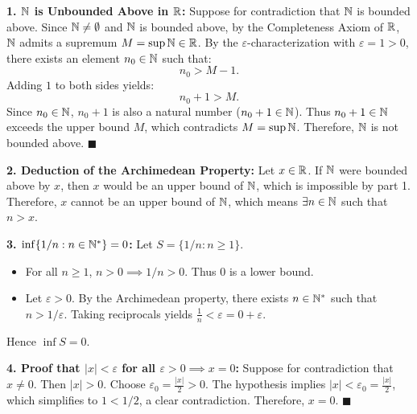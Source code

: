 \begin{tabletworkspace}[5.0cm]
\end{tabletworkspace}

\begin{solution}
\textbf{1. $\mathbb{N}$ is Unbounded Above in $\mathbb{R}$:}
Suppose for contradiction that $\mathbb{N}$ is bounded above.
Since $\mathbb{N} \ne \emptyset$ and $\mathbb{N}$ is bounded above, by the Completeness Axiom of $\mathbb{R}$, $\mathbb{N}$ admits a supremum $M = \sup \mathbb{N} \in \mathbb{R}$.
By the $\varepsilon$-characterization with $\varepsilon = 1 > 0$, there exists an element $n_0 \in \mathbb{N}$ such that:
\[
n_0 > M - 1.
\]
Adding $1$ to both sides yields:
\[
n_0 + 1 > M.
\]
Since $n_0 \in \mathbb{N}$, $n_0 + 1$ is also a natural number ($n_0 + 1 \in \mathbb{N}$).
Thus $n_0 + 1 \in \mathbb{N}$ exceeds the upper bound $M$, which contradicts $M = \sup \mathbb{N}$.
Therefore, $\mathbb{N}$ is not bounded above. \hfill $\blacksquare$

\textbf{2. Deduction of the Archimedean Property:}
Let $x \in \mathbb{R}$.
If $\mathbb{N}$ were bounded above by $x$, then $x$ would be an upper bound of $\mathbb{N}$, which is impossible by part 1.
Therefore, $x$ cannot be an upper bound of $\mathbb{N}$, which means $\exists n \in \mathbb{N}$ such that $n > x$.

\textbf{3. $\inf \{1/n : n \in \mathbb{N}^*\} = 0$:}
Let $S = \{1/n : n \ge 1\}$.
\begin{itemize}[leftmargin=1.5em,itemsep=1pt]
  \item For all $n \ge 1$, $n > 0 \implies 1/n > 0$. Thus $0$ is a lower bound.
  \item Let $\varepsilon > 0$. By the Archimedean property, there exists $n \in \mathbb{N}^*$ such that $n > 1/\varepsilon$.
  Taking reciprocals yields $\frac{1}{n} < \varepsilon = 0 + \varepsilon$.
\end{itemize}
Hence $\inf S = 0$.

\textbf{4. Proof that $|x| < \varepsilon$ for all $\varepsilon > 0 \implies x = 0$:}
Suppose for contradiction that $x \ne 0$. Then $|x| > 0$.
Choose $\varepsilon_0 = \frac{|x|}{2} > 0$.
The hypothesis implies $|x| < \varepsilon_0 = \frac{|x|}{2}$, which simplifies to $1 < 1/2$, a clear contradiction.
Therefore, $x = 0$. \hfill $\blacksquare$
\end{solution}

